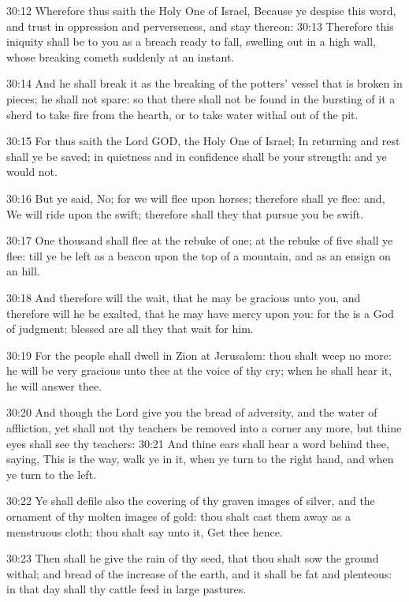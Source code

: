 30:12 Wherefore thus saith the Holy One of Israel, Because ye despise this word, and trust in oppression and perverseness, and stay thereon: 30:13 Therefore this iniquity shall be to you as a breach ready to fall, swelling out in a high wall, whose breaking cometh suddenly at an instant.

30:14 And he shall break it as the breaking of the potters' vessel that is broken in pieces; he shall not spare: so that there shall not be found in the bursting of it a sherd to take fire from the hearth, or to take water withal out of the pit.

30:15 For thus saith the Lord GOD, the Holy One of Israel; In returning and rest shall ye be saved; in quietness and in confidence shall be your strength: and ye would not.

30:16 But ye said, No; for we will flee upon horses; therefore shall ye flee: and, We will ride upon the swift; therefore shall they that pursue you be swift.

30:17 One thousand shall flee at the rebuke of one; at the rebuke of five shall ye flee: till ye be left as a beacon upon the top of a mountain, and as an ensign on an hill.

30:18 And therefore will the \LORD wait, that he may be gracious unto you, and therefore will he be exalted, that he may have mercy upon you: for the \LORD is a God of judgment: blessed are all they that wait for him.

30:19 For the people shall dwell in Zion at Jerusalem: thou shalt weep no more: he will be very gracious unto thee at the voice of thy cry; when he shall hear it, he will answer thee.

30:20 And though the Lord give you the bread of adversity, and the water of affliction, yet shall not thy teachers be removed into a corner any more, but thine eyes shall see thy teachers: 30:21 And thine ears shall hear a word behind thee, saying, This is the way, walk ye in it, when ye turn to the right hand, and when ye turn to the left.

30:22 Ye shall defile also the covering of thy graven images of silver, and the ornament of thy molten images of gold: thou shalt cast them away as a menstruous cloth; thou shalt say unto it, Get thee hence.

30:23 Then shall he give the rain of thy seed, that thou shalt sow the ground withal; and bread of the increase of the earth, and it shall be fat and plenteous: in that day shall thy cattle feed in large pastures.

